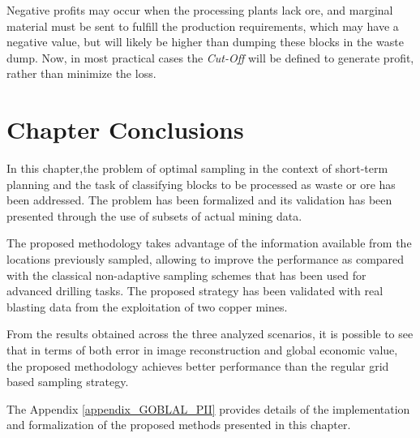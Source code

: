 Negative profits may occur when the processing plants lack ore, and marginal material must be sent to fulfill the production requirements, which may have a negative value, but will likely be higher than dumping these blocks in the waste dump. Now, in most practical cases the \emph{Cut-Off} will be defined to generate profit, rather than minimize the loss.













\section{Chapter Conclusions}
In this chapter,the problem of optimal sampling in the context of short-term planning and the task of classifying blocks to be processed as waste or ore  has been addressed. The problem has been formalized and its validation has been presented through the use of subsets of actual mining data. 

The proposed methodology takes advantage of the information available from the locations previously sampled, allowing to improve the performance as compared with the classical non-adaptive sampling schemes that has been used for advanced drilling tasks. The proposed strategy has been validated with real blasting data from the exploitation of two copper mines.

From the results obtained across the three analyzed scenarios, it is possible to see that in terms of both error in image reconstruction and global economic value, the proposed methodology achieves better performance than the regular grid based sampling strategy.





The Appendix \ref{appendix_GOBLAL_PII} provides details of the implementation and formalization of the proposed methods presented in this chapter.